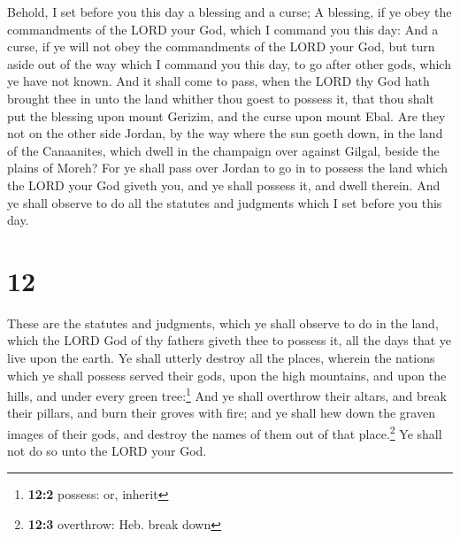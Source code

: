  Behold, I set before you this day a blessing and a
curse;  A blessing, if ye obey the commandments of the
LORD your God, which I command you this day:  And a
curse, if ye will not obey the commandments of the LORD your God, but
turn aside out of the way which I command you this day, to go after
other gods, which ye have not known.  And it shall come
to pass, when the LORD thy God hath brought thee in unto the land
whither thou goest to possess it, that thou shalt put the blessing upon
mount Gerizim, and the curse upon mount Ebal.  Are they
not on the other side Jordan, by the way where the sun goeth down, in
the land of the Canaanites, which dwell in the champaign over against
Gilgal, beside the plains of Moreh?  For ye shall pass
over Jordan to go in to possess the land which the LORD your God giveth
you, and ye shall possess it, and dwell therein.  And ye
shall observe to do all the statutes and judgments which I set before
you this day.

\hypertarget{section-11}{%
\section{12}\label{section-11}}

 These are the statutes and judgments, which ye shall
observe to do in the land, which the LORD God of thy fathers giveth thee
to possess it, all the days that ye live upon the earth. 
Ye shall utterly destroy all the places, wherein the nations which ye
shall possess served their gods, upon the high mountains, and upon the
hills, and under every green tree:\footnote{\textbf{12:2} possess: or,
  inherit}  And ye shall overthrow their altars, and break
their pillars, and burn their groves with fire; and ye shall hew down
the graven images of their gods, and destroy the names of them out of
that place.\footnote{\textbf{12:3} overthrow: Heb. break down}
 Ye shall not do so unto the LORD your God.

